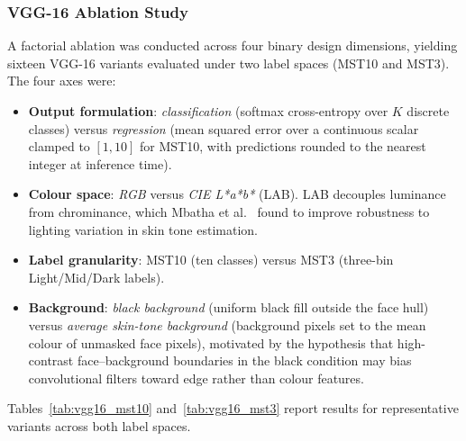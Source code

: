\subsubsection{VGG-16 Ablation Study}
\label{sec:vgg16_ablation}

A factorial ablation was conducted across four binary design dimensions, yielding sixteen VGG-16 variants evaluated under two label spaces (MST10 and MST3). The four axes were:

\begin{itemize}
	\item \textbf{Output formulation}: \emph{classification} (softmax cross-entropy over $K$ discrete classes) versus \emph{regression} (mean squared error over a continuous scalar clamped to $[1, 10]$ for MST10, with predictions rounded to the nearest integer at inference time).
	\item \textbf{Colour space}: \emph{RGB} versus \emph{CIE L*a*b*} (LAB). LAB decouples luminance from chrominance, which Mbatha et al.~\cite{Mbatha_2024_SkinToneLighting} found to improve robustness to lighting variation in skin tone estimation.
	\item \textbf{Label granularity}: MST10 (ten classes) versus MST3 (three-bin Light/Mid/Dark labels).
	\item \textbf{Background}: \emph{black background} (uniform black fill outside the face hull) versus \emph{average skin-tone background} (background pixels set to the mean colour of unmasked face pixels), motivated by the hypothesis that high-contrast face--background boundaries in the black condition may bias convolutional filters toward edge rather than colour features.
\end{itemize}

Tables~\ref{tab:vgg16_mst10} and~\ref{tab:vgg16_mst3} report results for representative variants across both label spaces.

